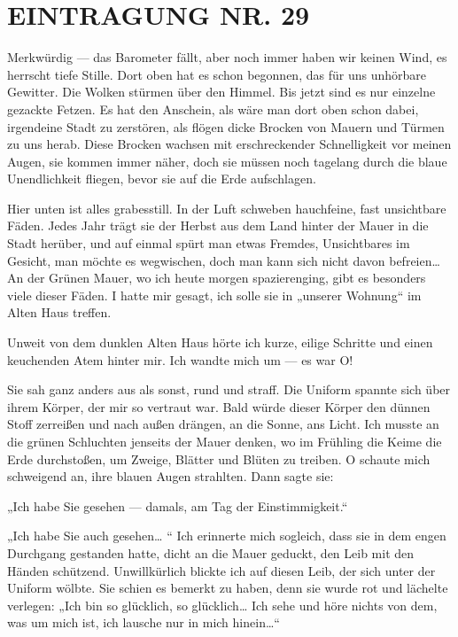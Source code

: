 \section{EINTRAGUNG NR. 29}

Merkwürdig — das Barometer fällt, aber noch immer haben wir keinen
Wind, es herrscht tiefe Stille. Dort oben hat es schon begonnen,
das für uns unhörbare Gewitter. Die Wolken stürmen über den Himmel.
Bis jetzt sind es nur einzelne gezackte Fetzen. Es hat den
Anschein, als wäre man dort oben schon dabei, irgendeine Stadt zu
zerstören, als flögen dicke Brocken von Mauern und Türmen zu uns
herab. Diese Brocken wachsen mit erschreckender Schnelligkeit vor
meinen Augen, sie kommen immer näher, doch sie müssen noch tagelang
durch die blaue Unendlichkeit fliegen, bevor sie auf die Erde
aufschlagen.

Hier unten ist alles grabesstill. In der Luft schweben hauchfeine,
fast unsichtbare Fäden. Jedes Jahr trägt sie der Herbst aus dem
Land hinter der Mauer in die Stadt herüber, und auf einmal spürt
man etwas Fremdes, Unsichtbares im Gesicht, man möchte es
wegwischen, doch man kann sich nicht davon befreien\ldots{} An der
Grünen Mauer, wo ich heute morgen spazierenging, gibt es besonders
viele dieser Fäden. I hatte mir gesagt, ich solle sie in „unserer
Wohnung“ im Alten Haus treffen.

Unweit von dem dunklen Alten Haus hörte ich kurze, eilige Schritte
und einen keuchenden Atem hinter mir. Ich wandte mich um — es war
O!

Sie sah ganz anders aus als sonst, rund und straff. Die Uniform
spannte sich über ihrem Körper, der mir so vertraut war. Bald würde
dieser Körper den dünnen Stoff zerreißen und nach außen drängen, an
die Sonne, ans Licht. Ich musste an die grünen Schluchten jenseits
der Mauer denken, wo im Frühling die Keime die Erde durchstoßen, um
Zweige, Blätter und Blüten zu treiben. O schaute mich schweigend
an, ihre blauen Augen strahlten. Dann sagte sie:

„Ich habe Sie gesehen — damals, am Tag der Einstimmigkeit.“

„Ich habe Sie auch gesehen\ldots{} “ Ich erinnerte mich sogleich, dass
sie in dem engen Durchgang gestanden hatte, dicht an die Mauer
geduckt, den Leib mit den Händen
schützend. Unwillkürlich blickte ich auf diesen Leib, der sich
unter der Uniform wölbte. Sie schien es bemerkt zu haben, denn sie
wurde rot und lächelte verlegen: „Ich bin so glücklich, so
glücklich\ldots{} Ich sehe und höre nichts von dem, was um mich ist, ich
lausche nur in mich hinein\ldots{}“

